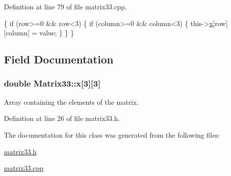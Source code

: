 Definition at line 79 of file matrix33.\-cpp.


\begin{DoxyCode}
\{
  \textcolor{keywordflow}{if} (row>=0 && row<3)
    \{
      \textcolor{keywordflow}{if} (column>=0 && column<3)
        \{
          this->\hyperlink{classMatrix33_af7f01fa466616eb7c8eda2e4d9f85cdd}{x}[row][column] = value;
        \}
    \}
\}
\end{DoxyCode}


\subsection{Field Documentation}
\hypertarget{classMatrix33_af7f01fa466616eb7c8eda2e4d9f85cdd}{
\subsubsection[{x}]{\setlength{\rightskip}{0pt plus 5cm}double Matrix33\-::x\mbox{[}3\mbox{]}\mbox{[}3\mbox{]}\hspace{0.3cm}{\ttfamily [protected]}}}\label{de/d82/classMatrix33_af7f01fa466616eb7c8eda2e4d9f85cdd}
Array containing the elements of the matrix. 

Definition at line 26 of file matrix33.\-h.



The documentation for this class was generated from the following files\-:\begin{DoxyCompactItemize}
\item 
\hyperlink{matrix33_8h}{matrix33.\-h}\item 
\hyperlink{matrix33_8cpp}{matrix33.\-cpp}\end{DoxyCompactItemize}
